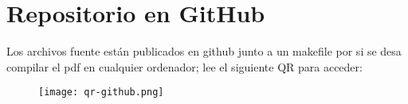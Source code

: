 \chapter{Repositorio en GitHub}
Los archivos fuente están publicados en github junto a un makefile por si se desa compilar el pdf en cualquier ordenador; lee el siguiente QR para acceder:

\begin{figure}[!h]
  \centering
    \texttt{[image: qr-github.png]}
\end{figure}
